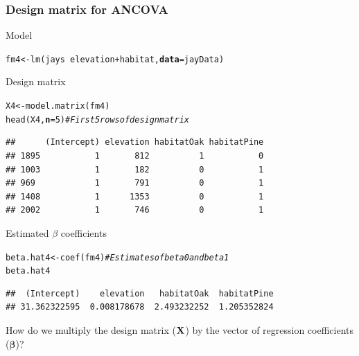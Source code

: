 \documentclass[color=usenames,dvipsnames]{beamer}\usepackage[]{graphicx}\usepackage[]{color}
\makeatletter
\newcommand{\hlnum}[1]{\textcolor[rgb]{0.69,0.494,0}{#1}}%
\newcommand{\hlcom}[1]{\textcolor[rgb]{0.514,0.506,0.514}{\textit{#1}}}%
\newcommand{\hlopt}[1]{\textcolor[rgb]{0,0,0}{#1}}%
\newcommand{\hlstd}[1]{\textcolor[rgb]{0,0,0}{#1}}%
\newcommand{\hlkwb}[1]{\textcolor[rgb]{0,0.341,0.682}{#1}}%
\newcommand{\hlkwc}[1]{\textcolor[rgb]{0,0,0}{\textbf{#1}}}%
\newcommand{\hlkwd}[1]{\textcolor[rgb]{0.004,0.004,0.506}{#1}}%
\newenvironment{kframe}{%
 \def\at@end@of@kframe{}%
 \ifinner\ifhmode%
  \def\at@end@of@kframe{\end{minipage}}%
  \begin{minipage}{\columnwidth}%
 \fi\fi%
 \def\FrameCommand##1{\hskip\@totalleftmargin \hskip-\fboxsep
 \colorbox{shadecolor}{##1}\hskip-\fboxsep
     \hskip-\linewidth \hskip-\@totalleftmargin \hskip\columnwidth}%
 \MakeFramed {\advance\hsize-\width
   \@totalleftmargin\z@ \linewidth\hsize
   \@setminipage}}%
 {\par\unskip\endMakeFramed%
 \at@end@of@kframe}
\newenvironment{knitrout}{}{} %
\makeatother
\begin{document}
\begin{frame}[fragile]
  \frametitle{Design matrix for ANCOVA}
  \scriptsize %
    {Model}
\begin{knitrout}\scriptsize
{}\color{fgcolor}\begin{kframe}
\begin{alltt}
\hlstd{fm4} \hlkwb{<-} \hlkwd{lm}\hlstd{(jays} \hlopt{~} \hlstd{elevation} \hlopt{+} \hlstd{habitat,} \hlkwc{data}\hlstd{=jayData)}
\end{alltt}
\end{kframe}
\end{knitrout}
\pause
\vfill
{Design matrix}

\begin{knitrout}\scriptsize
{}\color{fgcolor}\begin{kframe}
\begin{alltt}
\hlstd{X4} \hlkwb{<-} \hlkwd{model.matrix}\hlstd{(fm4)}
\hlkwd{head}\hlstd{(X4,} \hlkwc{n}\hlstd{=}\hlnum{5}\hlstd{)} \hlcom{# First 5 rows of design matrix}
\end{alltt}
\begin{verbatim}
##      (Intercept) elevation habitatOak habitatPine
## 1895           1       812          1           0
## 1003           1       182          0           1
## 969            1       791          0           1
## 1408           1      1353          0           1
## 2002           1       746          0           1
\end{verbatim}
\end{kframe}
\end{knitrout}

{Estimated $\beta$ coefficients}
\begin{knitrout}\scriptsize
{}\color{fgcolor}\begin{kframe}
\begin{alltt}
\hlstd{beta.hat4} \hlkwb{<-} \hlkwd{coef}\hlstd{(fm4)} \hlcom{# Estimates of beta0 and beta1}
\hlstd{beta.hat4}
\end{alltt}
\begin{verbatim}
##  (Intercept)    elevation   habitatOak  habitatPine 
## 31.362322595  0.008178678  2.493232252  1.205352824
\end{verbatim}
\end{kframe}
\end{knitrout}
\pause
\vfill
{\centering How do we multiply the design matrix ($\bf X$) by
 the vector of regression coefficients ($\bm \beta$)? \\}
\end{frame}
\end{document}
